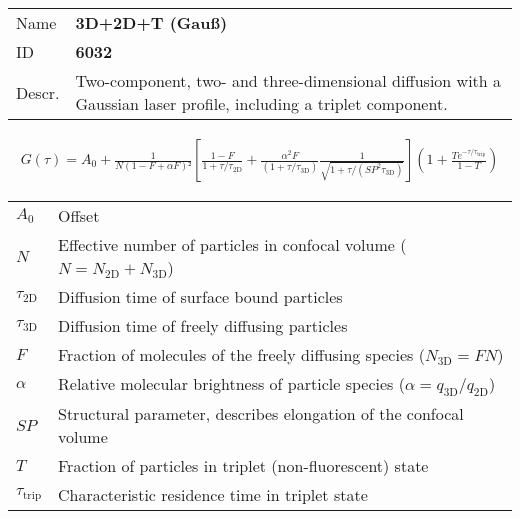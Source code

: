\noindent \begin{tabular}{lp{}}
Name & \textbf{3D+2D+T (Gauß)} \\ 
ID & \textbf{6032} \\ 
Descr. &  Two-component, two- and three-dimensional diffusion with a Gaussian laser profile, including a triplet component. \\ 
\end{tabular}
\begin{align}
G(\tau) = A_0 + \frac{1}{N (1 - F + \alpha F)²} \left[ \frac{1-F}{1+\tau/\tau_\mathrm{2D}} + \frac{ \alpha^2 F}{ (1+\tau/\tau_\mathrm{3D}) } \frac{1}{\sqrt{1+\tau/(\mathit{SP}^2 \tau_\mathrm{3D})}} \right] \left(1 + \frac{T e^{-\tau/\tau_\mathrm{trip}}}{1-T}  \right) 
\end{align} 
\begin{center}
\begin{tabular}{ll}
$A_0$ & Offset \\ 
$N$ & Effective number of particles in confocal volume ($N = N_\mathrm{2D}+N_\mathrm{3D}$) \\ 
$\tau_\mathrm{2D}$ &  Diffusion time of surface bound particles \\ 
$\tau_\mathrm{3D}$ &  Diffusion time of freely diffusing particles \\ 
$F$ & Fraction of molecules of the freely diffusing species ($N_\mathrm{3D} = F N$) \\
$\alpha$ & Relative molecular brightness of particle species ($ \alpha = q_\mathrm{3D}/q_\mathrm{2D}$) \\
$\mathit{SP}$ & Structural parameter, describes elongation of the confocal volume \\
$T$ &  Fraction of particles in triplet (non-fluorescent) state\\ 
$\tau_\mathrm{trip}$ &  Characteristic residence time in triplet state \\ 
\end{tabular}
\end{center}
\vspace{2em}


